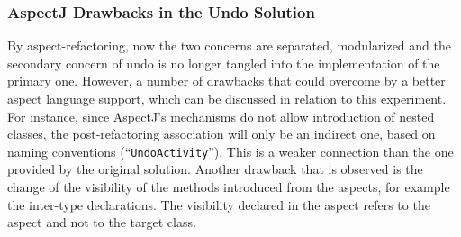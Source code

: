\subsubsection{AspectJ Drawbacks in the Undo Solution}
By aspect-refactoring, now the two concerns are separated, modularized and the secondary concern of undo is no longer tangled into the implementation of the primary one. 
However, a number of drawbacks that could overcome by a better aspect language support, which can be discussed in relation to this experiment. 
For instance, since AspectJ's mechanisms do not allow introduction of nested classes, the post-refactoring association will only be an indirect one, based on naming conventions (``\texttt{UndoActivity}''). 
This is a weaker connection than the one provided by the original solution. 
Another drawback that is observed is the change of the visibility of the methods introduced from the aspects, for example the inter-type declarations. 
The visibility declared in the aspect refers to the aspect and not to the target class. 


